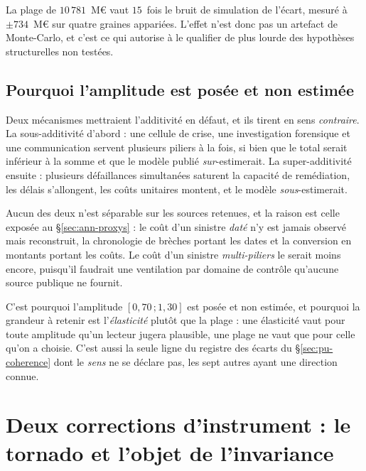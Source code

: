 \vspace{4pt}
\noindent La plage de $10\,781$~M\euro{} vaut $15$~fois le bruit de simulation de l'écart, mesuré à
$\pm 734$~M\euro{} sur quatre graines appariées. L'effet n'est donc pas un artefact de Monte-Carlo,
et c'est ce qui autorise à le qualifier de plus lourde des hypothèses structurelles non testées.

\subsection*{Pourquoi l'amplitude est posée et non estimée}

Deux mécanismes mettraient l'additivité en défaut, et ils tirent en sens \emph{contraire}. La
sous-additivité d'abord : une cellule de crise, une investigation forensique et une communication
servent plusieurs piliers à la fois, si bien que le total serait inférieur à la somme et que le
modèle publié \emph{sur}-estimerait. La super-additivité ensuite : plusieurs défaillances
simultanées saturent la capacité de remédiation, les délais s'allongent, les coûts unitaires
montent, et le modèle \emph{sous}-estimerait.

Aucun des deux n'est séparable sur les sources retenues, et la raison est celle exposée au
\S\ref{sec:ann-proxys} : le coût d'un sinistre \emph{daté} n'y est jamais observé mais reconstruit,
la chronologie de brèches portant les dates et la conversion en montants portant les coûts. Le coût
d'un sinistre \emph{multi-piliers} le serait moins encore, puisqu'il faudrait une ventilation par
domaine de contrôle qu'aucune source publique ne fournit.

C'est pourquoi l'amplitude $[0{,}70\,;1{,}30]$ est posée et non estimée, et pourquoi la
grandeur à retenir est l'\emph{élasticité} plutôt que la plage : une élasticité vaut pour toute
amplitude qu'un lecteur jugera plausible, une plage ne vaut que pour celle qu'on a choisie. C'est
aussi la seule ligne du registre des écarts du \S\ref{sec:pu-coherence} dont le \emph{sens} ne se
déclare pas, les sept autres ayant une direction connue.

\section{Deux corrections d'instrument : le tornado et l'objet de l'invariance}
\label{sec:ann-corrections-instrument}

